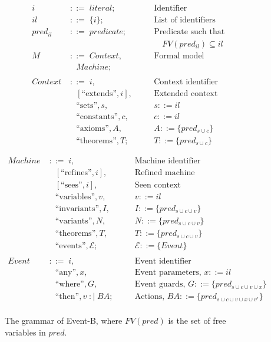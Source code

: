 \begin{figure}[t]
\centering
\footnotesize
\setlength{\jot}{0pt}

\begin{minipage}[t]{0.4\columnwidth}
\[
\begin{alignedat}{2}
i &\;::=\; \textit{literal}; &\quad& \text{Identifier} \\
il &\;::=\; \{i\}; & & \text{List of identifiers} \\
pred_{il} &\;::=\; predicate; & & \text{Predicate such that } \\
 & & & \quad FV(pred_{il}) \subseteq il \\
M &\;::=\; {Context}, & & \text{Formal model} \\
 & \quad {Machine}; & & \\
 & & & \\
Context &\;::=\; i, & & \text{Context identifier} \\
 & \quad [\text{``extends''},i], & & \text{Extended context} \\
 & \quad \text{``sets''},s, & & s ::= il \\
 & \quad \text{``constants''},c, & & c ::= il \\
 & \quad \text{``axioms''},A, & & A ::= \{pred_{s \cup c}\} \\
 & \quad \text{``theorems''},T; & & T ::= \{pred_{s \cup c}\} 
\end{alignedat}
\]
\end{minipage}
\hfill
\begin{minipage}[t]{0.57\columnwidth}
\[
\begin{alignedat}{2}
Machine &\;::=\; i, &\quad& \text{Machine identifier} \\
 & \quad [\text{``refines''},i], & & \text{Refined machine} \\
 & \quad [\text{``sees''},i], & & \text{Seen context} \\
 & \quad \text{``variables''},v, & & v ::= il\\
 & \quad \text{``invariants''},I, & & I ::= \{pred_{s \cup c \cup v}\} \\
 & \quad \text{``variants''},N, & & N::= \{pred_{s \cup c \cup v}\} \\
 & \quad \text{``theorems''},T, & & T ::= \{pred_{s \cup c \cup v}\} \\
 & \quad \text{``events''},\mathcal{E}; & & \mathcal{E} ::= \{Event\} \\
 & & & \\
Event &\;::=\; i, & & \text{Event identifier} \\
 & \quad \text{``any''},x, & & \text{Event parameters, } x ::= il \\
 & \quad \text{``where''},G, & & \text{Event guards, } G ::= \{pred_{s \cup c \cup v \cup x}\} \\
 & \quad \text{``then''},v \;:|\; BA; & & \text{Actions, } BA ::= \{pred_{s \cup c \cup v \cup x \cup v'}\} \\
\end{alignedat}
\]
\end{minipage}

\caption{The grammar of Event-B, where \(FV(pred)\) is the set of free variables in \(pred\).}
\label{fig:grammar}
\end{figure}
